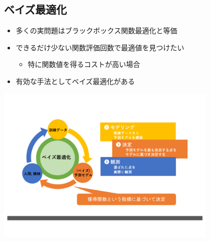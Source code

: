 \documentclass[dvipdfmx, 10.5pt]{beamer}
\begin{document}
\subsection{ベイズ最適化}
\begin{frame}{\insertsubsection}

	\begin{itemize}
		\item 多くの実問題はブラックボックス関数最適化と等価
		\item できるだけ少ない関数評価回数で最適値を見つけたい
		\begin{itemize}
			\item 特に関数値を得るコストが高い場合
		\end{itemize}
		\item 有効な手法として\alert{ベイズ最適化}がある
	\end{itemize}
	\vspace{10pt}
	\begin{center}
		\includegraphics[width=0.80\textwidth]{./Fig/BO.pdf}
	\end{center}

\end{frame}
\end{document}
